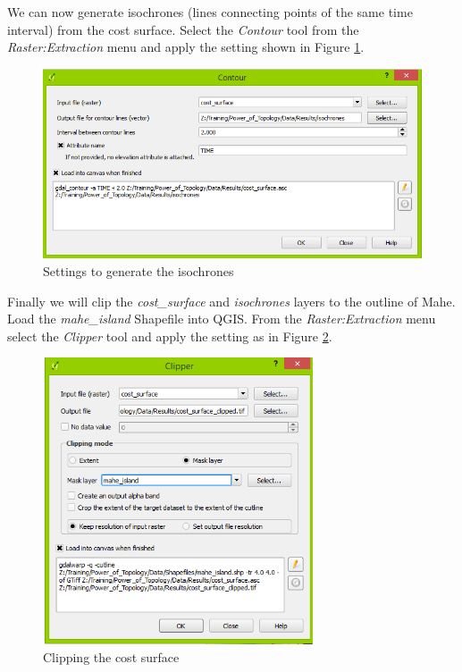 \documentclass[a4paper,12pt,titlepage]{article}
\begin{document}
We can now generate isochrones (lines connecting points of the same time interval) from the cost surface. Select the \textit{Contour} tool from the \textit{Raster:Extraction} menu and apply the setting shown in Figure \ref{fig:contour_settings}.

\begin{figure}[htb]
	\centering
	\includegraphics[width=12cm]{Images/contour_settings.png}
	\caption{Settings to generate the isochrones}\label{fig:contour_settings}
\end{figure}

Finally we will clip the \textit{cost\_surface} and \textit{isochrones} layers to the outline of Mahe. Load the \textit{mahe\_island} Shapefile into QGIS. From the \textit{Raster:Extraction} menu select the \textit{Clipper} tool and apply the setting as in Figure \ref{fig:clip_cost_surface}.

\begin{figure}[htb]
	\centering
	\includegraphics[width=8cm]{Images/clip_cost_surface.png}
	\caption{Clipping the cost surface}\label{fig:clip_cost_surface}
\end{figure}
\end{document}
